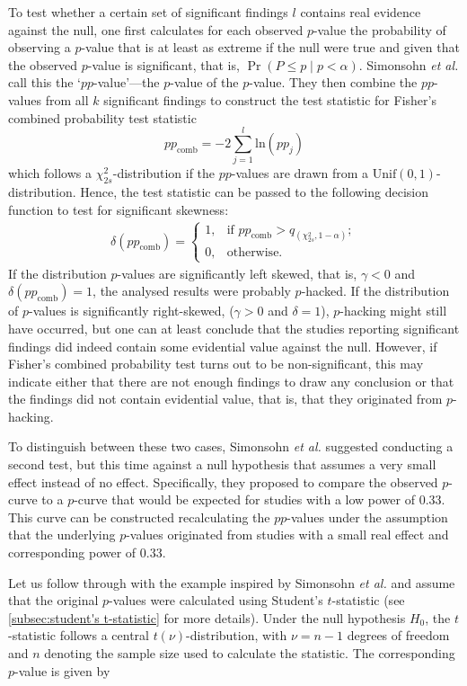 To test whether a certain set of significant findings $l$ contains real evidence against the null, one first calculates for each observed $p$-value the probability of observing a $p$-value that is at least as extreme if the null were true and given that the observed $p$-value is significant, that is, ${\Pr(P \leq p \mid p < \alpha)}$. Simonsohn \textit{et al.} call this the `$pp$-value'---the $p$-value of the $p$-value. They then combine the $pp$-values from all $k$ significant findings to construct the test statistic for Fisher's combined probability test statistic $$pp_{\text{comb}} = -2\sum_{j=1}^l \text{ln}(pp_j)$$
which follows a $\chi_{2s}^2$-distribution if the $pp$-values are drawn from a $\text{Unif}(0,1)$-distribution. Hence, the test statistic can be passed to the following decision function to test for significant skewness:
\begin{align*}
    \delta(pp_{\text{comb}}) = \begin{cases} 1, & \text{if } pp_{\text{comb}} > q_{(\chi_{2s}^2,1-\alpha)}; \\ 
    0, & \mbox{otherwise}.\end{cases}
\end{align*}
If the distribution $p$-values are significantly left skewed, that is, ${\gamma < 0}$ and ${\delta(pp_{\text{comb}}) = 1}$, the analysed results were probably $p$-hacked. If the distribution of $p$-values is significantly right-skewed, (${\gamma > 0}$ and ${\delta = 1}$), $p$-hacking might still have occurred, but one can at least conclude that the studies reporting significant findings did indeed contain some evidential value against the null. However, if Fisher's combined probability test turns out to be non-significant, this may indicate either that there are not enough findings to draw any conclusion or that the findings did not contain evidential value, that is, that they originated from $p$-hacking.\par
To distinguish between these two cases, Simonsohn \textit{et al.} suggested conducting a second test, but this time against a null hypothesis that assumes a very small effect instead of no effect. Specifically, they proposed to compare the observed $p$-curve to a $p$-curve that would be expected for studies with a low power of $0.33$. This curve can be constructed recalculating the $pp$-values under the assumption that the underlying $p$-values originated from studies with a small real effect and corresponding power of $0.33$.\par
Let us follow through with the example inspired by Simonsohn \textit{et al.} and assume that the original $p$-values were calculated using Student's $t$-statistic (see \ref{subsec:student's t-statistic} for more details). Under the null hypothesis $H_0$, the $t$-statistic follows a central $t(\nu)$-distribution, with $\nu = n-1$ degrees of freedom and $n$ denoting the sample size used to calculate the statistic. The corresponding $p$-value is given by
